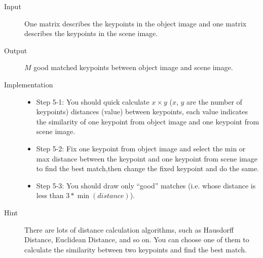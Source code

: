 \documentclass[12pt]{article}
\begin{document}
\begin{description}
\item[Input] One matrix describes the keypoints in the object image and one matrix describes the keypoints in the scene image.
\item[Output] $M$ good matched keypoints between object image and scene image.
\item[Implementation] \mbox{}
\begin{itemize}
\item Step 5-1: You should quick calculate $x \times y$ ($x$, $y$ are the number of keypoints) distances (value) between keypoints, each value indicates the similarity of one keypoint from object image and one keypoint from scene image.
\item Step 5-2: Fix one keypoint from object image and select the min or max distance between the keypoint and one keypoint from scene image to find the best match,then change the fixed keypoint and do the same.
\item Step 5-3: You should draw only ``good'' matches (i.e. whose distance is less than $3*\min(distance)$).
\end{itemize}   
\item[Hint] There are lots of distance calculation algorithms, such as Hausdorff Distance, Euclidean Distance, and so on. You can choose one of them to calculate the similarity between two keypoints and find the best match.
\begin{figure}[!ht]
  \centering 
  \subfigure[]{ 
    \label{fig: result: b} %
}
\end{figure}
\end{description}
\end{document}
